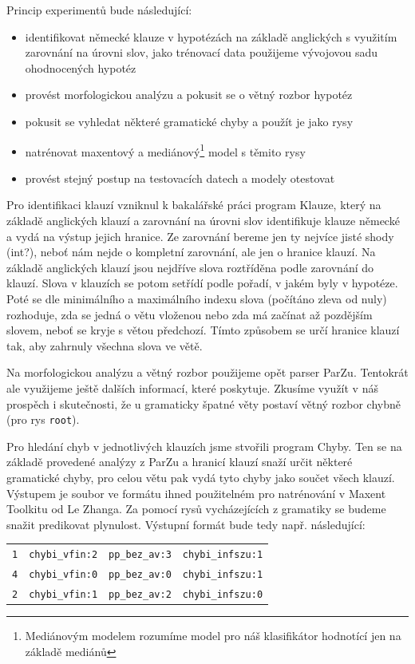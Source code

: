 \documentclass[12pt,a4paper]{report}
\begin{document}
Princip experimentů bude následující:
\begin{itemize}
\item{identifikovat německé klauze v hypotézách na základě anglických s využitím zarovnání na úrovni slov, jako trénovací data použijeme vývojovou sadu ohodnocených hypotéz}
\item{provést morfologickou analýzu a pokusit se o větný rozbor hypotéz}
\item{pokusit se vyhledat některé gramatické chyby a použít je jako rysy}
\item{natrénovat maxentový a mediánový\footnote{Mediánovým modelem rozumíme model pro náš klasifikátor hodnotící jen na základě mediánů} model s těmito rysy}
\item{provést stejný postup na testovacích datech a modely otestovat}
\end{itemize}

Pro identifikaci klauzí vzniknul k bakalářské práci program Klauze, který na základě anglických klauzí a zarovnání na úrovni slov identifikuje klauze německé a vydá na výstup jejich hranice. Ze zarovnání bereme jen ty nejvíce jisté shody (int?), neboť nám nejde o kompletní zarovnání, ale jen o hranice klauzí. Na základě anglických klauzí jsou nejdříve slova roztříděna podle zarovnání do klauzí. Slova v klauzích se potom setřídí podle pořadí, v jakém byly v hypotéze. Poté se dle minimálního a maximálního indexu slova (počítáno zleva od nuly) rozhoduje, zda se jedná o větu vloženou nebo zda má začínat až pozdějším slovem, neboť se kryje s větou předchozí. Tímto způsobem se určí hranice klauzí tak, aby zahrnuly všechna slova ve větě.

Na morfologickou analýzu a větný rozbor použijeme opět parser ParZu. Tentokrát ale využijeme ještě dalších informací, které poskytuje. Zkusíme využít v náš prospěch i skutečnosti, že u gramaticky špatné věty postaví větný rozbor chybně (pro rys \texttt{root}).

Pro hledání chyb v jednotlivých klauzích jsme stvořili program Chyby. Ten se na základě provedené analýzy z ParZu a hranicí klauzí snaží určit některé gramatické chyby, pro celou větu pak vydá tyto chyby jako součet všech klauzí. Výstupem je soubor ve formátu ihned použitelném pro natrénování v Maxent Toolkitu od Le Zhanga. Za pomocí rysů vycházejících z gramatiky se budeme snažit predikovat plynulost. Výstupní formát bude tedy např. následující:

\begin{center}
\begin{tabular}{llll}
\hline
\texttt{1} & \texttt{chybi\_vfin:2} & \texttt{pp\_bez\_av:3} & \texttt{chybi\_infszu:1} \\
\texttt{4} & \texttt{chybi\_vfin:0} & \texttt{pp\_bez\_av:0} & \texttt{chybi\_infszu:1} \\
\texttt{2} & \texttt{chybi\_vfin:1} & \texttt{pp\_bez\_av:2} & \texttt{chybi\_infszu:0} \\
\hline
\end{tabular}
\end{center}
\end{document}

